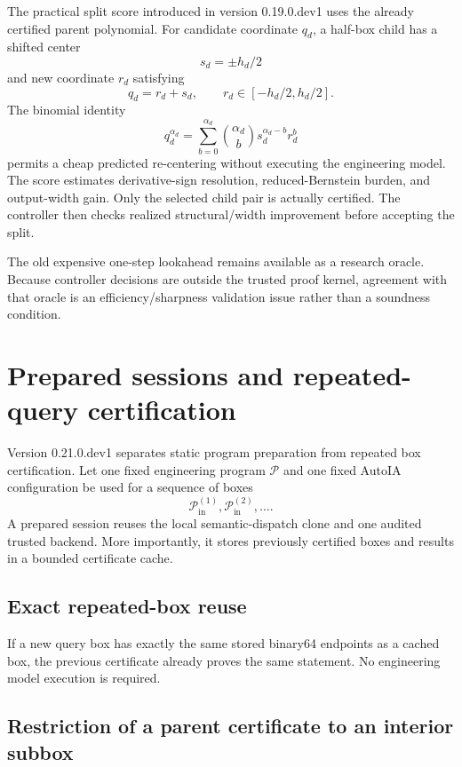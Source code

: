 \documentclass[11pt]{article}
\newcommand{\Pin}{\mathcal{P}_{\mathrm{in}}}
\begin{document}
The practical split score introduced in version 0.19.0.dev1 uses the already
certified parent polynomial.  For candidate coordinate \(q_d\), a half-box child
has a shifted center
\[
  s_d=\pm h_d/2
\]
and new coordinate \(r_d\) satisfying
\[
  q_d=r_d+s_d,
  \qquad
  r_d\in[-h_d/2,h_d/2].
\]
The binomial identity
\[
  q_d^{\alpha_d}
  =\sum_{b=0}^{\alpha_d}
    {\alpha_d\choose b}s_d^{\alpha_d-b}r_d^b
\]
permits a cheap predicted re-centering without executing the engineering model.
The score estimates derivative-sign resolution, reduced-Bernstein burden, and
output-width gain.  Only the selected child pair is actually certified.  The
controller then checks realized structural/width improvement before accepting
the split.

The old expensive one-step lookahead remains available as a research oracle.
Because controller decisions are outside the trusted proof kernel, agreement with
that oracle is an efficiency/sharpness validation issue rather than a soundness
condition.

\section{Prepared sessions and repeated-query certification}

Version 0.21.0.dev1 separates static program preparation from repeated box
certification.  Let one fixed engineering program \(\mathcal{P}\) and one fixed
AutoIA configuration be used for a sequence of boxes
\[
  \Pin^{(1)},\Pin^{(2)},\ldots.
\]
A prepared session reuses the local semantic-dispatch clone and one audited
trusted backend.  More importantly, it stores previously certified boxes and
results in a bounded certificate cache.

\subsection{Exact repeated-box reuse}

If a new query box has exactly the same stored binary64 endpoints as a cached
box, the previous certificate already proves the same statement.  No engineering
model execution is required.

\subsection{Restriction of a parent certificate to an interior subbox}
\end{document}
